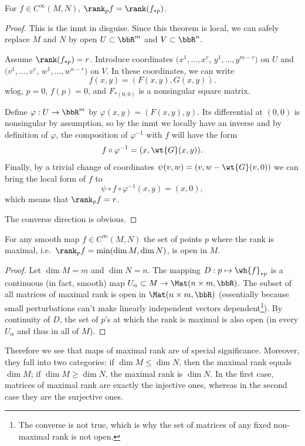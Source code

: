 \begin{thm}\label{Rank thm}
For $f\in C^\infty(M,N)$, $\rank_p f=\rank (f_{\ast p})$.
\end{thm}
\begin{proof}
This is the \gls{inmt} in disguise. Since this theorem is local, we can safely replace $M$ and $N$ by open $U\subset \bbR^m$ and $V\subset \bbR^n.$

Assume $\rank(f_{\ast p})=r$. Introduce coordinates $(x^1,\ldots,x^r$, $y^1,\ldots,y^{m-r})$ on $U$ and $(v^1,\ldots,v^r$, $w^1,\ldots,w^{n-r})$ on $V$. In these coordinates, we can write \[f(x,y)=(F(x,y),G(x,y)).\] \Gls{wlog}, $p=0$, $f(p)=0$, and  $F_{\ast (0,0)}$ is a nonsingular square matrix.

Define $\varphi:U\to\bbR^m$ by $\varphi(x,y)=(F(x,y),y)$. Its differential at $(0,0)$ is nonsingular by assumption, so by the \gls{inmt} we locally have an inverse and by definition of $\varphi$, the composition of $\varphi^{-1}$ with $f$ will have the form 
\[
f\circ\varphi^{-1}=(x,\wt{G}(x,y)).
\]
Finally, by a trivial change of coordinates $\psi(v,w)=(v,w-\wt{G}(v,0))$ we can bring the local form of $f$ to \[\psi\circ f\circ \varphi^{-1}(x,y)=(x,0),\] which means that $\rank_p f=r$.

The converse direction is obvious.
\end{proof}

\begin{prop}\label{domain of maximal rank}
    For any smooth map $f\in C^\infty (M,N)$ the set of points $p$ where the rank is maximal, i.e.\ $\rank_p f=\min(\dim M,\dim N)$, is open in $M$.
\end{prop}
\begin{proof}
    Let $\dim M=m$ and $\dim N=n$. The mapping $D:p\mapsto \wh{f}_{\ast p}$ is a continuous (in fact, smooth) map $U_\alpha\subset M\to \Mat(n\times m,\bbR )$. The subset of all matrices of maximal rank is open in $\Mat(n\times m,\bbR )$ (essentially because small perturbations can't make linearly independent vectors dependent\footnote{The converse is not true, which is why the set of matrices of any fixed non-maximal rank is not open.}). By continuity of $D$, the set of $p$'s at which the rank is maximal is also open (in every $U_\alpha$ and thus in all of $M$).
\end{proof}

Therefore we see that maps of maximal rank are of special significance. Moreover, they fall into two categories: if $\dim M\leq \dim N$, then the maximal rank equals $\dim M$; if $\dim M\geq \dim N$, the maximal rank is $\dim N$. In the first case, matrices of maximal rank are exactly the injective ones, whereas in the second case they are the surjective ones.

